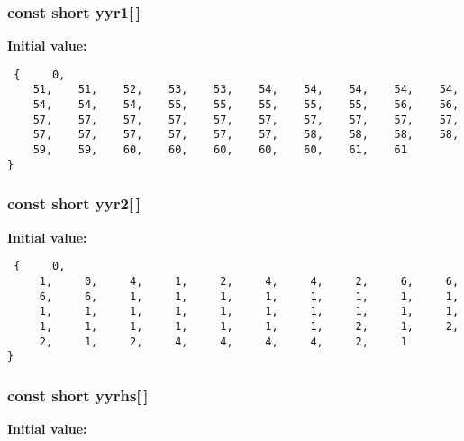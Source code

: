 \subsubsection{\setlength{\rightskip}{0pt plus 5cm}const short yyr1[$\,$]\hspace{0.3cm}{\tt  [static]}}\label{vcd__parser_8c_a88}


{\bf Initial value:}

\footnotesize\begin{verbatim} {     0,
    51,    51,    52,    53,    53,    54,    54,    54,    54,    54,
    54,    54,    54,    55,    55,    55,    55,    55,    56,    56,
    57,    57,    57,    57,    57,    57,    57,    57,    57,    57,
    57,    57,    57,    57,    57,    57,    58,    58,    58,    58,
    59,    59,    60,    60,    60,    60,    60,    61,    61
}\end{verbatim}\normalsize 
{}
\subsubsection{\setlength{\rightskip}{0pt plus 5cm}const short yyr2[$\,$]\hspace{0.3cm}{\tt  [static]}}\label{vcd__parser_8c_a89}


{\bf Initial value:}

\footnotesize\begin{verbatim} {     0,
     1,     0,     4,     1,     2,     4,     4,     2,     6,     6,
     6,     6,     1,     1,     1,     1,     1,     1,     1,     1,
     1,     1,     1,     1,     1,     1,     1,     1,     1,     1,
     1,     1,     1,     1,     1,     1,     1,     2,     1,     2,
     2,     1,     2,     4,     4,     4,     4,     2,     1
}\end{verbatim}\normalsize 
{}
\subsubsection{\setlength{\rightskip}{0pt plus 5cm}const short yyrhs[$\,$]\hspace{0.3cm}{\tt  [static]}}\label{vcd__parser_8c_a85}


{\bf Initial value:}

